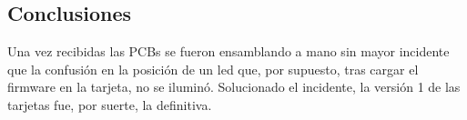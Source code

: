 \documentclass[paper=a4, fontsize=11pt,twoside]{scrartcl}	%
\begin{document}
    \subsection{Conclusiones}
        Una vez recibidas las PCBs se fueron ensamblando a mano sin mayor incidente que la confusión en la 
        posición de un led que, por supuesto, tras cargar el firmware en la tarjeta, no se iluminó.
        Solucionado el incidente, la versión 1 de las tarjetas fue, por suerte, la definitiva.
\end{document}
